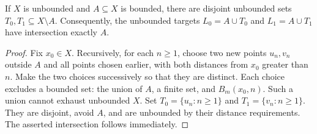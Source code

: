 \begin{lemma}
\label{mt:tails}
If $X$ is unbounded and $A\subseteq X$ is bounded, there are disjoint
unbounded sets $T_0,T_1\subseteq X\setminus A$. Consequently, the
unbounded targets $L_0=A\cup T_0$ and $L_1=A\cup T_1$ have
intersection exactly $A$.
\end{lemma}
\begin{proof}
Fix $x_0\in X$. Recursively, for each $n\ge1$, choose two new points
$u_n,v_n$ outside $A$ and all points chosen earlier, with both distances
from $x_0$ greater than $n$. Make the two choices successively so that
they are distinct. Each choice excludes a bounded set: the union of $A$,
a finite set, and $B_m(x_0,n)$. Such a union cannot exhaust unbounded
$X$. Set $T_0=\{u_n:n\ge1\}$ and $T_1=\{v_n:n\ge1\}$.
They are disjoint, avoid $A$, and are unbounded by their distance
requirements. The asserted intersection follows immediately.
\end{proof}

